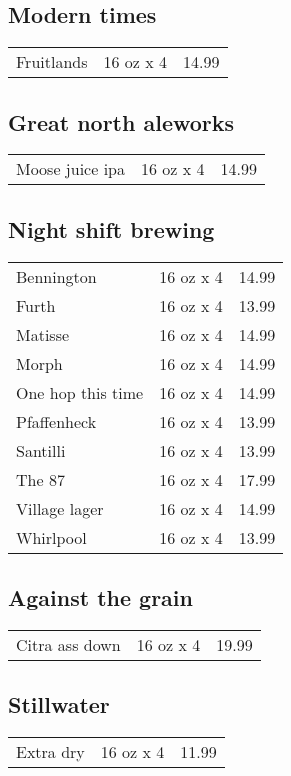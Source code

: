 \documentclass{article}%
\begin{document}
\begin{multicols}{3}
%
\subsection*{Modern times}%
\begin{tabular}{l c r}%
Fruitlands&16 oz x 4&14.99\\%
\end{tabular}

%
\subsection*{Great north aleworks}%
\begin{tabular}{l c r}%
Moose juice ipa&16 oz x 4&14.99\\%
\end{tabular}

%
\subsection*{Night shift brewing}%
\begin{tabular}{l c r}%
Bennington&16 oz x 4&14.99\\%
Furth&16 oz x 4&13.99\\%
Matisse&16 oz x 4&14.99\\%
Morph&16 oz x 4&14.99\\%
One hop this time&16 oz x 4&14.99\\%
Pfaffenheck&16 oz x 4&13.99\\%
Santilli&16 oz x 4&13.99\\%
The 87&16 oz x 4&17.99\\%
Village lager&16 oz x 4&14.99\\%
Whirlpool&16 oz x 4&13.99\\%
\end{tabular}

%
\subsection*{Against the grain}%
\begin{tabular}{l c r}%
Citra ass down&16 oz x 4&19.99\\%
\end{tabular}

%
\subsection*{Stillwater}%
\begin{tabular}{l c r}%
Extra dry&16 oz x 4&11.99\\%
\end{tabular}


\end{multicols}
\end{document}
